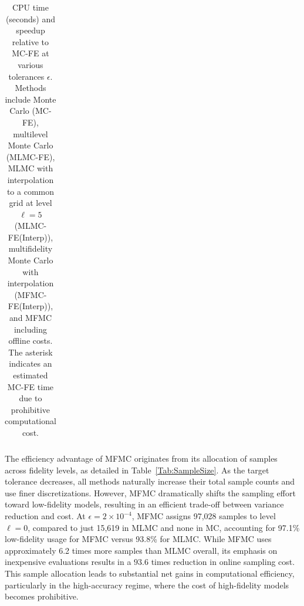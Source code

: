 \begin{table}[ht]
{\begin{tabular}{c|c|c|c|c|c|c|c|c|c|c|c|c|}
			\hline
	\end{tabular}
 }
	\caption{CPU time (seconds) and speedup relative to MC-FE at various tolerances $\epsilon$. Methods include Monte Carlo (MC-FE), multilevel Monte Carlo (MLMC-FE), MLMC with interpolation to a common grid at level $\ell=5$ (MLMC-FE(Interp)), multifidelity Monte Carlo with interpolation (MFMC-FE(Interp)), and MFMC including offline costs. The asterisk indicates an estimated MC-FE time due to prohibitive computational cost.}
	\label{Tab:CPU_time}
\end{table}
%

The efficiency advantage of MFMC originates from its allocation of samples across fidelity levels, as detailed in Table~\ref{Tab:SampleSize}. As the target tolerance decreases, all methods naturally increase their total sample counts and use finer discretizations. However, MFMC dramatically shifts the sampling effort toward low-fidelity models, resulting in an efficient trade-off between variance reduction and cost. At $\epsilon = 2\times 10^{-4}$, MFMC assigns 97,028 samples to level $\ell = 0$, compared to just 15,619 in MLMC and none in MC, accounting for 97.1\% low-fidelity usage for MFMC versus 93.8\% for MLMC. While MFMC uses approximately 6.2 times more samples than MLMC overall, its emphasis on inexpensive evaluations results in a $93.6$  times reduction in online sampling cost. This sample allocation leads to substantial net gains in computational efficiency, particularly in the high-accuracy regime, where the cost of high-fidelity models becomes prohibitive.

